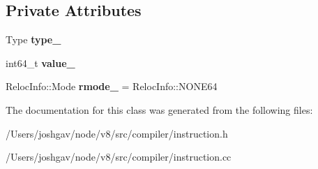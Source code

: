 \subsection*{Private Attributes}
\begin{DoxyCompactItemize}
\item 
Type {\bfseries type\+\_\+}\hypertarget{classv8_1_1internal_1_1compiler_1_1_constant_a1acdd5a2cc80eed3b860595791d16f09}{}\label{classv8_1_1internal_1_1compiler_1_1_constant_a1acdd5a2cc80eed3b860595791d16f09}

\item 
int64\+\_\+t {\bfseries value\+\_\+}\hypertarget{classv8_1_1internal_1_1compiler_1_1_constant_aab8d226eeedf1c978ed4c78519cec603}{}\label{classv8_1_1internal_1_1compiler_1_1_constant_aab8d226eeedf1c978ed4c78519cec603}

\item 
Reloc\+Info\+::\+Mode {\bfseries rmode\+\_\+} = Reloc\+Info\+::\+N\+O\+N\+E64\hypertarget{classv8_1_1internal_1_1compiler_1_1_constant_a8540d1193ff104d563a557c9ab59590b}{}\label{classv8_1_1internal_1_1compiler_1_1_constant_a8540d1193ff104d563a557c9ab59590b}

\end{DoxyCompactItemize}


The documentation for this class was generated from the following files\+:\begin{DoxyCompactItemize}
\item 
/\+Users/joshgav/node/v8/src/compiler/instruction.\+h\item 
/\+Users/joshgav/node/v8/src/compiler/instruction.\+cc\end{DoxyCompactItemize}
